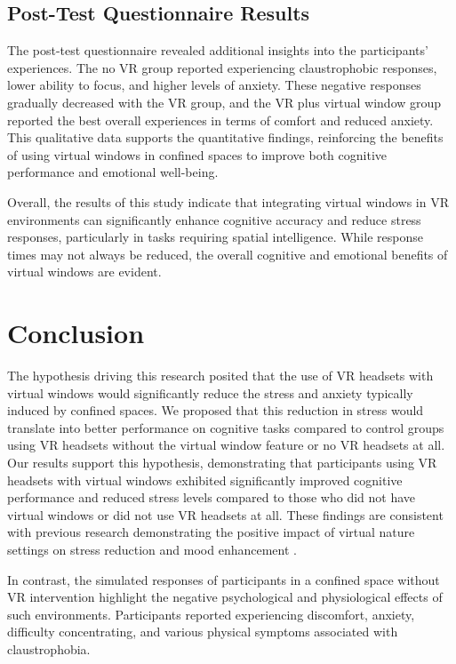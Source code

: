 \documentclass[runningheads]{llncs}
\begin{document}
\clearpage

\subsection{Post-Test Questionnaire Results}

The post-test questionnaire revealed additional insights into the participants' experiences. The no VR group reported experiencing claustrophobic responses, lower ability to focus, and higher levels of anxiety. These negative responses gradually decreased with the VR group, and the VR plus virtual window group reported the best overall experiences in terms of comfort and reduced anxiety. This qualitative data supports the quantitative findings, reinforcing the benefits of using virtual windows in confined spaces to improve both cognitive performance and emotional well-being.

Overall, the results of this study indicate that integrating virtual windows in VR environments can significantly enhance cognitive accuracy and reduce stress responses, particularly in tasks requiring spatial intelligence. While response times may not always be reduced, the overall cognitive and emotional benefits of virtual windows are evident.

\section{Conclusion}

The hypothesis driving this research posited that the use of VR headsets with virtual windows would significantly reduce the stress and anxiety typically induced by confined spaces. We proposed that this reduction in stress would translate into better performance on cognitive tasks compared to control groups using VR headsets without the virtual window feature or no VR headsets at all. Our results support this hypothesis, demonstrating that participants using VR headsets with virtual windows exhibited significantly improved cognitive performance and reduced stress levels compared to those who did not have virtual windows or did not use VR headsets at all. These findings are consistent with previous research demonstrating the positive impact of virtual nature settings on stress reduction and mood enhancement \cite{valchanov2010}.

In contrast, the simulated responses of participants in a confined space without VR intervention highlight the negative psychological and physiological effects of such environments. Participants reported experiencing discomfort, anxiety, difficulty concentrating, and various physical symptoms associated with claustrophobia.
\end{document}
